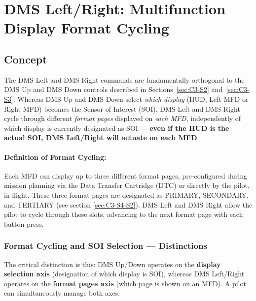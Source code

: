 \documentclass[11pt, a4paper, twoside]{report}
\begin{document}
\section{DMS Left/Right: Multifunction Display Format Cycling}
\label{sec:C3-S4}


\subsection{Concept}
\label{sec:C3-S4-S1}

The DMS Left and DMS Right commands are fundamentally orthogonal to the DMS Up and DMS Down controls described in Sections~\ref{sec:C3-S2} and~\ref{sec:C3-S3}. Whereas DMS Up and DMS Down select \textit{which display} (HUD, Left MFD or Right MFD) becomes the Sensor of Interest (SOI), DMS Left and DMS Right cycle through different \textit{format pages} displayed on \textit{each MFD}, independently of which display is currently designated as SOI --- \textbf{even if the HUD is the actual SOI, DMS Left/Right will actuate on each MFD}.

\paragraph{Definition of Format Cycling:}

Each MFD can display up to three different format pages, pre-configured during mission planning via the Data Transfer Cartridge (DTC) or directly by the pilot, in-flight. These three format pages are designated as PRIMARY, SECONDARY, and TERTIARY (see section \ref{sec:C3-S4-S2}). DMS Left and DMS Right allow the pilot to cycle through these slots, advancing to the next format page with each button press.
\subsubsection{Format Cycling and SOI Selection --- Distinctions}
\label{sec:C3-S4-S1-S1}

The critical distinction is this: DMS Up/Down operates on the \textbf{display selection axis} (designation of which display is SOI), whereas DMS Left/Right operates on the \textbf{format pages axis} (which page is shown on an MFD). A pilot can simultaneously manage both axes:
\end{document}
